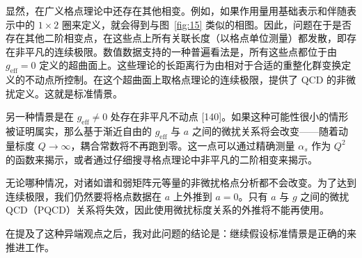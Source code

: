 显然，在广义格点理论中还存在其他相变。例如，如果作用量用基础表示和伴随表示中的 $1 \times 2$ 圈来定义，就会得到与图~\ref{fig:15} 类似的相图。因此，问题在于是否存在其他二阶相变点，在这些点上所有关联长度（以格点单位测量）都发散，即存在非平凡的连续极限。数值数据支持的一种普遍看法是，所有这些点都位于由 $g_{\mathrm{eff}} = 0$ 定义的超曲面上。这些理论的长距离行为由相对于合适的重整化群变换定义的不动点所控制。在这个超曲面上取格点理论的连续极限，提供了 QCD 的非微扰定义。这就是标准情景。

另一种情景是在 $g_{\mathrm{eff}} \neq 0$ 处存在非平凡不动点 [140]。如果这种可能性很小的情形被证明属实，那么基于渐近自由的 $g_{\mathrm{eff}}$ 与 $a$ 之间的微扰关系将会改变——随着动量标度 $Q \to \infty$，耦合常数将不再跑到零。这一点可以通过精确测量 $\alpha_s$ 作为 $Q^2$ 的函数来揭示，或者通过仔细搜寻格点理论中非平凡的二阶相变来揭示。

无论哪种情况，对诸如谱和弱矩阵元等量的非微扰格点分析都不会改变。为了达到连续极限，我们仍然要将格点数据在 $a$ 上外推到 $a = 0$。只有 $a$ 与 $g$ 之间的微扰QCD（PQCD）关系将失效，因此使用微扰标度关系的外推将不能再使用。

在提及了这种异端观点之后，我对此问题的结论是：继续假设标准情景是正确的来推进工作。
